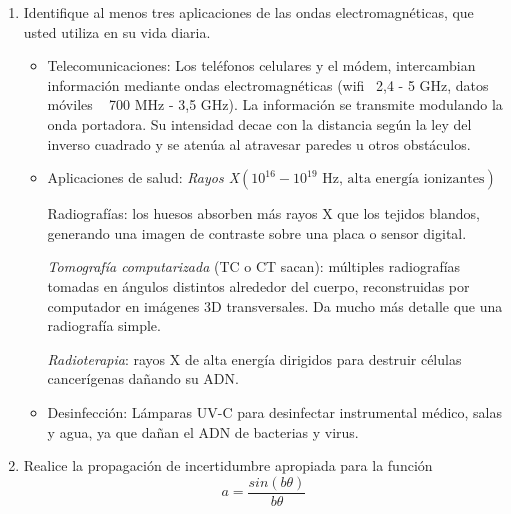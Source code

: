 \documentclass{article}
\begin{document}
\begin{enumerate}
		\vspace{0.3cm}
		
		\item Identifique al menos tres aplicaciones de las ondas electromagnéticas, que usted utiliza en su vida diaria.
		
		\vspace{0.3cm}
		
		\begin{itemize}
			\item Telecomunicaciones:
			Los teléfonos celulares y el módem, intercambian información mediante ondas electromagnéticas (wifi ~2,4 - 5 GHz, datos móviles ~ 700 MHz - 3,5 GHz). La información se transmite modulando la onda portadora. Su intensidad decae con la distancia según la ley del inverso cuadrado y se atenúa al atravesar paredes u otros obstáculos.
			
			\item Aplicaciones de salud:
			\textsl{Rayos X}$(10^{16} - 10^{19} \text{ Hz, alta energía ionizantes})$ 
			
			Radiografías: los huesos absorben más rayos X que los tejidos blandos, generando una imagen de contraste sobre una placa o sensor digital.
			
			\textsl{Tomografía computarizada} (TC o CT sacan): múltiples radiografías tomadas en ángulos distintos alrededor del cuerpo, reconstruidas por computador en imágenes 3D transversales. Da mucho más detalle que una radiografía simple.
			
			\textsl{Radioterapia}: rayos X de alta energía dirigidos para destruir células cancerígenas dañando su ADN.
			
			\item Desinfección: Lámparas UV-C para desinfectar instrumental médico, salas y agua, ya que dañan el ADN de bacterias y virus.
		\end{itemize}
		
		\vspace{0.3cm}
		
		\item Realice la propagación de incertidumbre apropiada para la función \[a=\frac{sin{(b\theta)}}{b\theta}\]
		
		\vspace{0.3cm}
		
		\vspace{0.3cm}
		
		
	\end{enumerate}
	
\end{document}
